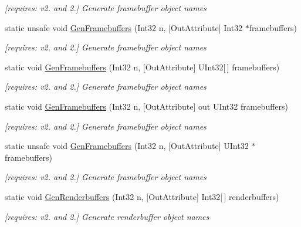 \begin{DoxyCompactItemize}
\begin{DoxyCompactList}\small\item\em \mbox{[}requires\-: v2. and 2.\mbox{]} Generate framebuffer object names \end{DoxyCompactList}\item 
static unsafe void \hyperlink{class_open_t_k_1_1_graphics_1_1_e_s20_1_1_g_l_aa8e176de3765341a20f13b83e08855c5}{Gen\-Framebuffers} (Int32 n, \mbox{[}Out\-Attribute\mbox{]} Int32 $\ast$framebuffers)
\begin{DoxyCompactList}\small\item\em \mbox{[}requires\-: v2. and 2.\mbox{]} Generate framebuffer object names \end{DoxyCompactList}\item 
static void \hyperlink{class_open_t_k_1_1_graphics_1_1_e_s20_1_1_g_l_a0d68b6d8e0d9216ffa0d4a9be0654773}{Gen\-Framebuffers} (Int32 n, \mbox{[}Out\-Attribute\mbox{]} U\-Int32\mbox{[}$\,$\mbox{]} framebuffers)
\begin{DoxyCompactList}\small\item\em \mbox{[}requires\-: v2. and 2.\mbox{]} Generate framebuffer object names \end{DoxyCompactList}\item 
static void \hyperlink{class_open_t_k_1_1_graphics_1_1_e_s20_1_1_g_l_aeed628dcafaf29b3d43cdcb51198835f}{Gen\-Framebuffers} (Int32 n, \mbox{[}Out\-Attribute\mbox{]} out U\-Int32 framebuffers)
\begin{DoxyCompactList}\small\item\em \mbox{[}requires\-: v2. and 2.\mbox{]} Generate framebuffer object names \end{DoxyCompactList}\item 
static unsafe void \hyperlink{class_open_t_k_1_1_graphics_1_1_e_s20_1_1_g_l_ab1df90e9876c6aa3cf6d1a7f5a0a7257}{Gen\-Framebuffers} (Int32 n, \mbox{[}Out\-Attribute\mbox{]} U\-Int32 $\ast$framebuffers)
\begin{DoxyCompactList}\small\item\em \mbox{[}requires\-: v2. and 2.\mbox{]} Generate framebuffer object names \end{DoxyCompactList}\item 
static void \hyperlink{class_open_t_k_1_1_graphics_1_1_e_s20_1_1_g_l_ae474ab18f0c51ee398d44d4291e97c3c}{Gen\-Renderbuffers} (Int32 n, \mbox{[}Out\-Attribute\mbox{]} Int32\mbox{[}$\,$\mbox{]} renderbuffers)
\begin{DoxyCompactList}\small\item\em \mbox{[}requires\-: v2. and 2.\mbox{]} Generate renderbuffer object names \end{DoxyCompactList}\item 

\end{DoxyCompactItemize}
